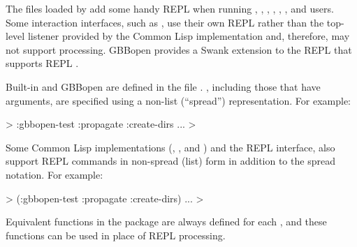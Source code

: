 \documentclass[10pt,twoside,english,pdftex]{article}
\begin{document}
%
%
%
The files loaded by 
add some handy REPL  when running
%
,
,
,
,
,
, and
%
users.  Some interaction interfaces, such as
, use their own REPL
rather than the top-level listener provided by the Common Lisp implementation
and, therefore, may not support  
processing.  GBBopen provides a Swank extension to the
 REPL that supports
REPL .

Built-in and GBBopen  are defined in the file
.
, including those that have arguments, are specified
using a non-list (``spread'') representation.  For example:
%
\W\supp
\begin{example}
  > :gbbopen-test :propagate :create-dirs
       ...
  >
\end{example}

Some Common Lisp implementations (,
, and
) and the
 REPL interface, also
support REPL commands in non-spread (list) form in addition to the
spread notation.  For example:
%
\W\supp\notpretop
\begin{example}
  > (:gbbopen-test :propagate :create-dirs)
       ...
  >
\end{example}
%

Equivalent functions in the  package are always
defined for each , and these functions can be used in
place of REPL  processing.
\end{document}
